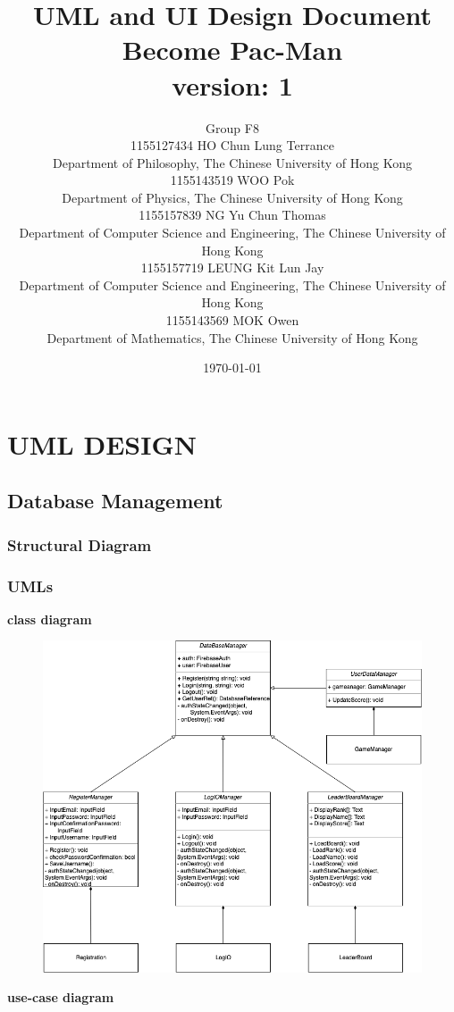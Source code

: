 \documentclass[11pt]{article}
\title{UML and UI Design Document\\Become Pac-Man\\version: 1}
\author{Group F8\\1155127434 HO Chun Lung Terrance\\
Department of Philosophy, The Chinese University of Hong Kong\\1155143519 WOO Pok\\
Department of Physics, The Chinese University of Hong Kong\\1155157839 NG Yu Chun Thomas\\
Department of Computer Science and Engineering, The Chinese University of Hong Kong\\1155157719 LEUNG Kit Lun Jay\\
Department of Computer Science and Engineering, The Chinese University of Hong Kong\\1155143569 MOK Owen\\
Department of Mathematics, The Chinese University of Hong Kong}
\date{\today}
\begin{document}
\maketitle
\tableofcontents
\newpage
\section{UML DESIGN}

\subsection{Database Management}
\subsubsection{Structural Diagram}
\subsubsection{UMLs}
\textbf{class diagram}\\
\begin{figure}[H]
    \centering
    \includegraphics*[scale=0.4]{Database_Class.drawio.png}
\end{figure}
\textbf{use-case diagram}\\
\end{document}
